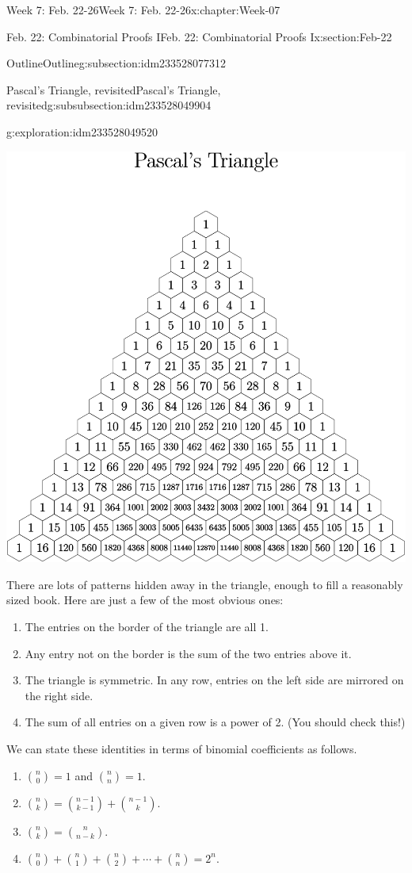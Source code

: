 \documentclass[oneside,10pt,]{book}
\numberwithin{equation}{section}
\begin{document}
\begin{chapterptx}{Week 7: Feb. 22-26}{}{Week 7: Feb. 22-26}{}{}{x:chapter:Week-07}
\begin{sectionptx}{Feb. 22: Combinatorial Proofs I}{}{Feb. 22: Combinatorial Proofs I}{}{}{x:section:Feb-22}
\begin{subsectionptx}{Outline}{}{Outline}{}{}{g:subsection:idm233528077312}
\begin{subsubsectionptx}{Pascal's Triangle, revisited}{}{Pascal's Triangle, revisited}{}{}{g:subsubsection:idm233528049904}
\begin{exploration}{}{g:exploration:idm233528049520}
\begin{image}{0}{1}{0}
\includegraphics[width=\linewidth]{./img/pascal-large.svg}
\end{image}%
There are lots of patterns hidden away in the triangle, enough to fill a reasonably sized book. Here are just a few of the most obvious ones:%
\begin{enumerate}
\item{}The entries on the border of the triangle are all 1.%
\item{}Any entry not on the border is the sum of the two entries above it.%
\item{}The triangle is symmetric. In any row, entries on the left side are mirrored on the right side.%
\item{}The sum of all entries on a given row is a power of 2. (You should check this!)%
\end{enumerate}
We can state these identities in terms of binomial coefficients as follows.%
%
\begin{enumerate}
\item{}\({n \choose 0} = 1\) and \({n \choose n} = 1\).%
\item{}\({n \choose k} = {n-1 \choose k-1} + {n-1 \choose k}\).%
\item{}\({n \choose k} = {n \choose n-k}\).%
\item{}\({n\choose 0} + {n \choose 1} + {n \choose 2} + \cdots + {n \choose n} = 2^n\).%

\end{enumerate}
\end{exploration}
\end{subsubsectionptx}
\end{subsectionptx}
\end{sectionptx}
\end{chapterptx}
\end{document}
